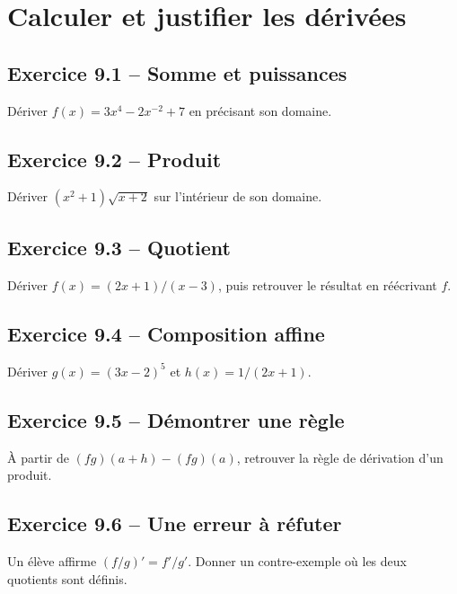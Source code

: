 \chapter{Calculer et justifier les dérivées}
\section*{Exercice 9.1 -- Somme et puissances}
Dériver $f(x)=3x^4-2x^{-2}+7$ en précisant son domaine.

\section*{Exercice 9.2 -- Produit}
Dériver $(x^2+1)\sqrt{x+2}$ sur l'intérieur de son domaine.

\section*{Exercice 9.3 -- Quotient}
Dériver $f(x)=(2x+1)/(x-3)$, puis retrouver le résultat en réécrivant $f$.

\section*{Exercice 9.4 -- Composition affine}
Dériver $g(x)=(3x-2)^5$ et $h(x)=1/(2x+1)$.

\section*{Exercice 9.5 -- Démontrer une règle}
À partir de $(fg)(a+h)-(fg)(a)$, retrouver la règle de dérivation d'un produit.

\section*{Exercice 9.6 -- Une erreur à réfuter}
Un élève affirme $(f/g)'=f'/g'$. Donner un contre-exemple où les deux quotients sont définis.
